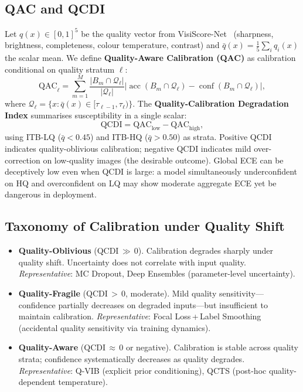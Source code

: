 \documentclass{bmvc2k}
\newcommand{\qbar}{\bar{q}}
\newcommand{\Q}{\mathcal{Q}}
\begin{document}
\subsection{QAC and QCDI}

Let $q(x)\in[0,1]^5$ be the quality vector from
VisiScore-Net~\cite{anonymous2025visiscore} (sharpness, brightness,
completeness, colour temperature, contrast) and $\qbar(x){=}\frac{1}{5}\sum_i
q_i(x)$ the scalar mean. We define \textbf{Quality-Aware Calibration (QAC)} as
calibration conditional on quality stratum $\ell$:
\begin{equation}
\text{QAC}_\ell = \sum_{m=1}^{M}
  \frac{|B_m\cap\Q_\ell|}{|\Q_\ell|}
  \big|\operatorname{acc}(B_m\cap\Q_\ell)-\operatorname{conf}(B_m\cap\Q_\ell)\big|,
\label{eq:qac}
\end{equation}
where $\Q_\ell{=}\{x:\qbar(x)\in[\tau_{\ell-1},\tau_\ell)\}$. The
\textbf{Quality-Calibration Degradation Index} summarises susceptibility in a
single scalar:
\begin{equation}
\text{QCDI} = \text{QAC}_{\text{low}} - \text{QAC}_{\text{high}},
\label{eq:qcdi}
\end{equation}
using ITB-LQ ($\qbar{<}0.45$) and ITB-HQ ($\qbar{>}0.50$) as strata.
Positive QCDI indicates quality-oblivious calibration; negative QCDI indicates
mild over-correction on low-quality images (the desirable outcome). Global ECE
can be deceptively low even when QCDI is large: a model simultaneously
underconfident on HQ and overconfident on LQ may show moderate aggregate ECE
yet be dangerous in deployment.

\subsection{Taxonomy of Calibration under Quality Shift}
\label{sec:taxonomy}

\begin{itemize}[leftmargin=*,itemsep=3pt]
\item \textbf{Quality-Oblivious} ($\text{QCDI}\,{\gg}\,0$). Calibration
degrades sharply under quality shift. Uncertainty does not correlate with
input quality. \textit{Representative}: MC Dropout, Deep Ensembles (parameter-level uncertainty).

\item \textbf{Quality-Fragile} ($\text{QCDI}\,{>}\,0$, moderate).
Mild quality sensitivity---confidence partially decreases on degraded inputs---but
insufficient to maintain calibration. \textit{Representative}: Focal
Loss\,+\,Label Smoothing (accidental quality sensitivity via training dynamics).

\item \textbf{Quality-Aware} ($\text{QCDI}\,{\approx}\,0$ or negative).
Calibration is stable across quality strata; confidence systematically
decreases as quality degrades. \textit{Representative}: Q-VIB (explicit prior
conditioning), QCTS (post-hoc quality-dependent temperature).
\end{itemize}
\end{document}
